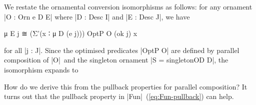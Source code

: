 We restate the ornamental conversion isomorphisms as follows: for any ornament |O : Orn e D E| where |D : Desc I| and |E : Desc J|, we have
\begin{code}
μ E j ≅ (Σ'(x ∶ μ D (e j))) OptP O (ok j) x
\end{code}
for all |j : J|.
Since the optimised predicates |OptP O| are defined by parallel composition of |O|~and the singleton ornament |S = singletonOD D|, the isomorphism expands to
How do we derive this from the pullback properties for parallel composition?
It turns out that the pullback property in |Fun|~(\ref{eq:Fun-pullback}) can help.

